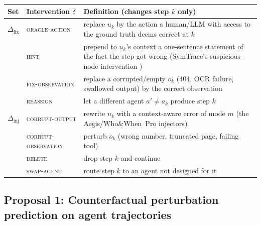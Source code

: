 \medskip\noindent\begin{minipage}{\linewidth}\centering\small
\begin{tabularx}{\linewidth}{@{}l l >{\RaggedRight}X@{}}\toprule
Set & Intervention $\delta$ & Definition (changes step $k$ only) \\\midrule
$\Delta_{\mathrm{fix}}$ & \textsc{oracle-action} & replace $u_k$ by the action a human/LLM with access to the ground truth deems correct at $k$ \\
 & \textsc{hint} & prepend to $u_k$'s context a one-sentence statement of the fact the step got wrong (SymTrace's suspicious-node intervention \cite{luan2026symtrace}) \\
 & \textsc{fix-observation} & replace a corrupted/empty $o_k$ (404, OCR failure, swallowed output) by the correct observation \\
 & \textsc{reassign} & let a different agent $a'\neq a_k$ produce step $k$ \\\midrule
$\Delta_{\mathrm{inj}}$ & \textsc{corrupt-output} & rewrite $u_k$ with a context-aware error of mode $m$ (the Aegis/Who\&When~Pro injectors) \\
 & \textsc{corrupt-observation} & perturb $o_k$ (wrong number, truncated page, failing tool) \\
 & \textsc{delete} & drop step $k$ and continue \\
 & \textsc{swap-agent} & route step $k$ to an agent not designed for it \\\bottomrule
\end{tabularx}
\label{tab:vocab}
\end{minipage}\medskip

\subsection{Proposal 1: Counterfactual perturbation prediction on agent trajectories}\label{sec:future:perturb}

